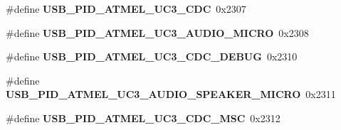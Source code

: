 \begin{DoxyCompactItemize}
\item 
\mbox{\label{group__usb__atmel__ids__group_gac2efd8861d003f7b5933abbe604b7ea1}} 
\#define {\bfseries U\+S\+B\+\_\+\+P\+I\+D\+\_\+\+A\+T\+M\+E\+L\+\_\+\+U\+C3\+\_\+\+C\+DC}~0x2307
\item 
\mbox{\label{group__usb__atmel__ids__group_ga02ed0d32e8e439ad888dbe84fadb8aaa}} 
\#define {\bfseries U\+S\+B\+\_\+\+P\+I\+D\+\_\+\+A\+T\+M\+E\+L\+\_\+\+U\+C3\+\_\+\+A\+U\+D\+I\+O\+\_\+\+M\+I\+C\+RO}~0x2308
\item 
\mbox{\label{group__usb__atmel__ids__group_gaa61c3875223bb266b9ad2c15e9bcd446}} 
\#define {\bfseries U\+S\+B\+\_\+\+P\+I\+D\+\_\+\+A\+T\+M\+E\+L\+\_\+\+U\+C3\+\_\+\+C\+D\+C\+\_\+\+D\+E\+B\+UG}~0x2310
\item 
\mbox{\label{group__usb__atmel__ids__group_ga010990fba35831f6098e8b612734540c}} 
\#define {\bfseries U\+S\+B\+\_\+\+P\+I\+D\+\_\+\+A\+T\+M\+E\+L\+\_\+\+U\+C3\+\_\+\+A\+U\+D\+I\+O\+\_\+\+S\+P\+E\+A\+K\+E\+R\+\_\+\+M\+I\+C\+RO}~0x2311
\item 
\mbox{\label{group__usb__atmel__ids__group_ga127317fe6fdf787d27384ea41b316353}} 
\#define {\bfseries U\+S\+B\+\_\+\+P\+I\+D\+\_\+\+A\+T\+M\+E\+L\+\_\+\+U\+C3\+\_\+\+C\+D\+C\+\_\+\+M\+SC}~0x2312
\end{DoxyCompactItemize}
